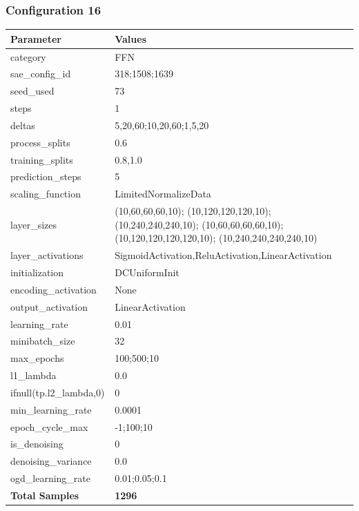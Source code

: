 \documentclass[a4paper,11pt,oneside]{article}
\theoremstyle{plain}
\theoremstyle{definition}
\begin{document}
	\newpage
	\subsubsection{Configuration 16}\label{config16}
	\begin{longtable}[H]{|p{0.3\linewidth}|p{0.7\linewidth}|} \hline \textbf{Parameter} &\textbf{Values} \\\hline{category} & {FFN} \\\hline
		{sae\_config\_id} & {318;1508;1639} \\\hline
		{seed\_used} & {73} \\\hline
		{steps} & {1} \\\hline
		{deltas} & {5,20,60;10,20,60;1,5,20} \\\hline
		{process\_splits} & {0.6} \\\hline
		{training\_splits} & {0.8,1.0} \\\hline
		{prediction\_steps} & {5} \\\hline
		{scaling\_function} & {LimitedNormalizeData} \\\hline
		{layer\_sizes} & {(10,60,60,60,10); (10,120,120,120,10); (10,240,240,240,10); (10,60,60,60,60,10); (10,120,120,120,120,10); (10,240,240,240,240,10)} \\\hline
		{layer\_activations} & {SigmoidActivation,ReluActivation,LinearActivation} \\\hline
		{initialization} & {DCUniformInit} \\\hline
		{encoding\_activation} & {None} \\\hline
		{output\_activation} & {LinearActivation} \\\hline
		{learning\_rate} & {0.01} \\\hline
		{minibatch\_size} & {32} \\\hline
		{max\_epochs} & {100;500;10} \\\hline
		{l1\_lambda} & {0.0} \\\hline
		{ifnull(tp.l2\_lambda,0)} & {0} \\\hline
		{min\_learning\_rate} & {0.0001} \\\hline
		{epoch\_cycle\_max} & {-1;100;10} \\\hline
		{is\_denoising} & {0} \\\hline
		{denoising\_variance} & {0.0} \\\hline
		{ogd\_learning\_rate} & {0.01;0.05;0.1} \\\hline
		{\textbf{Total Samples}} & {\textbf{1296}} \\\hline
	\end{longtable}
	
\end{document}
